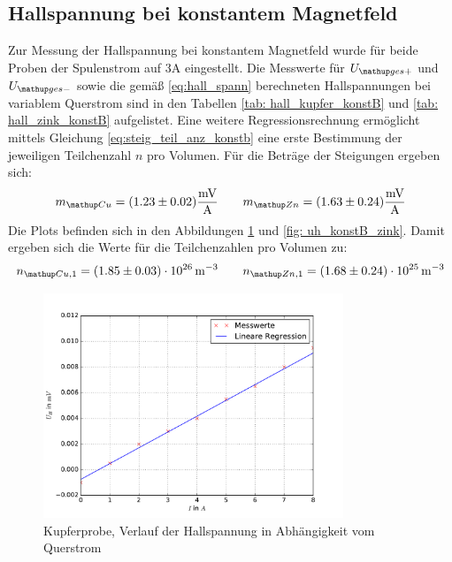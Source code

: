 \subsection{Hallspannung bei konstantem Magnetfeld}
Zur Messung der Hallspannung bei konstantem Magnetfeld wurde für beide Proben der Spulenstrom auf $3\si{\ampere}$ eingestellt. Die %
Messwerte für $U\ua{ges+}$ und $U\ua{ges-}$ sowie die gemäß \eqref{eq:hall_spann} berechneten Hallspannungen bei variablem Querstrom sind in den %
Tabellen \ref{tab: hall_kupfer_konstB} und \ref{tab: hall_zink_konstB} aufgelistet. Eine weitere Regressionsrechnung ermöglicht mittels Gleichung \eqref{eq:steig_teil_anz_konstb} eine
erste Bestimmung der jeweiligen Teilchenzahl $n$ pro Volumen. Für die Beträge der Steigungen ergeben sich: %
\begin{equation}
  m\ua{Cu} = (1.23 \pm 0.02)\si{\milli \volt \per \ampere}  \quad \quad m\ua{Zn} = (1.63 \pm 0.24)\si{\milli \volt \per \ampere}%
\end{equation}
Die Plots befinden sich in den Abbildungen \ref{fig: uh_konstB_kupfer} und \ref{fig: uh_konstB_zink}.
Damit ergeben sich die Werte für die Teilchenzahlen pro Volumen zu:
\begin{equation}
  n\ua{Cu,1} = (1.85 \pm 0.03)\cdot 10^{26}\,\si{ \meter^{-3}} \quad \quad n\ua{Zn,1} = (1.68\pm 0.24)\cdot 10^{25}\,\si{ \meter^{-3}}%
\end{equation}
\begin{figure}
  \centering
  \includegraphics[width=0.8\textwidth]{pics/u_h_kupfer_konstB.pdf}
  \caption{Kupferprobe, Verlauf der Hallspannung in Abhängigkeit vom Querstrom}
  \label{fig: uh_konstB_kupfer}
\end{figure}
